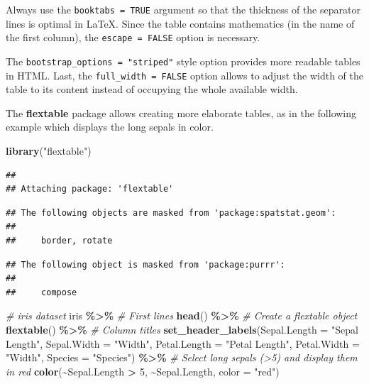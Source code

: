 \documentclass[
  12pt,
  american,
  a4paper,
  extrafontsizes,onecolumn,openright
  ]{memoir}
\newenvironment{Shaded}{\begin{snugshade}}{\end{snugshade}}
\newcommand{\AttributeTok}[1]{\textcolor[rgb]{0.13,0.29,0.53}{#1}}
\newcommand{\CommentTok}[1]{\textcolor[rgb]{0.56,0.35,0.01}{\textit{#1}}}
\newcommand{\DecValTok}[1]{\textcolor[rgb]{0.00,0.00,0.81}{#1}}
\newcommand{\FunctionTok}[1]{\textcolor[rgb]{0.13,0.29,0.53}{\textbf{#1}}}
\newcommand{\NormalTok}[1]{#1}
\newcommand{\SpecialCharTok}[1]{\textcolor[rgb]{0.81,0.36,0.00}{\textbf{#1}}}
\newcommand{\StringTok}[1]{\textcolor[rgb]{0.31,0.60,0.02}{#1}}
\begin{document}
Always use the \texttt{booktabs\ =\ TRUE} argument so that the thickness of the separator lines is optimal in LaTeX.
Since the table contains mathematics (in the name of the first column), the \texttt{escape\ =\ FALSE} option is necessary.

The \texttt{bootstrap\_options\ =\ "striped"} style option provides more readable tables in HTML.
Last, the \texttt{full\_width\ =\ FALSE} option allows to adjust the width of the table to its content instead of occupying the whole available width.

The \textbf{flextable} package allows creating more elaborate tables, as in the following example which displays the long sepals in color.

\scriptsize

\begin{Shaded}
\begin{Highlighting}[]
\FunctionTok{library}\NormalTok{(}\StringTok{"flextable"}\NormalTok{)}
\end{Highlighting}
\end{Shaded}

\begin{verbatim}
## 
## Attaching package: 'flextable'
\end{verbatim}

\begin{verbatim}
## The following objects are masked from 'package:spatstat.geom':
## 
##     border, rotate
\end{verbatim}

\begin{verbatim}
## The following object is masked from 'package:purrr':
## 
##     compose
\end{verbatim}

\begin{Shaded}
\begin{Highlighting}[]
\CommentTok{\# iris dataset}
\NormalTok{iris }\SpecialCharTok{\%\textgreater{}\%}
    \CommentTok{\# First lines}
\FunctionTok{head}\NormalTok{() }\SpecialCharTok{\%\textgreater{}\%}
    \CommentTok{\# Create a flextable object}
\FunctionTok{flextable}\NormalTok{() }\SpecialCharTok{\%\textgreater{}\%}
    \CommentTok{\# Column titles}
\FunctionTok{set\_header\_labels}\NormalTok{(}\AttributeTok{Sepal.Length =} \StringTok{"Sepal Length"}\NormalTok{, }\AttributeTok{Sepal.Width =} \StringTok{"Width"}\NormalTok{,}
    \AttributeTok{Petal.Length =} \StringTok{"Petal Length"}\NormalTok{, }\AttributeTok{Petal.Width =} \StringTok{"Width"}\NormalTok{, }\AttributeTok{Species =} \StringTok{"Species"}\NormalTok{) }\SpecialCharTok{\%\textgreater{}\%}
    \CommentTok{\# Select long sepals (\textgreater{}5) and display them in red}
\FunctionTok{color}\NormalTok{(}\SpecialCharTok{\textasciitilde{}}\NormalTok{Sepal.Length }\SpecialCharTok{\textgreater{}} \DecValTok{5}\NormalTok{, }\SpecialCharTok{\textasciitilde{}}\NormalTok{Sepal.Length, }\AttributeTok{color =} \StringTok{"red"}\NormalTok{)}
\end{Highlighting}
\end{Shaded}
\end{document}
